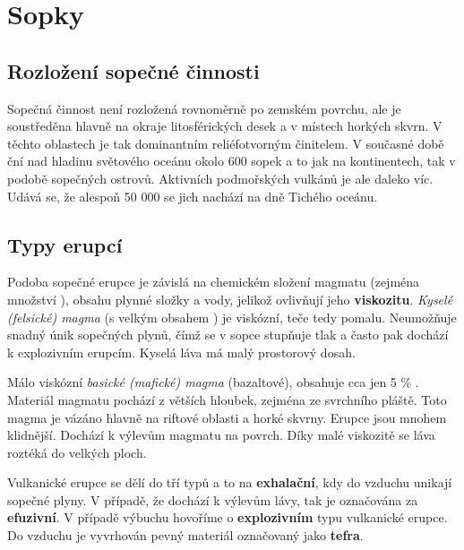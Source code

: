 \section{Sopky}
\subsection{Rozložení sopečné činnosti}

Sopečná činnost není rozložená rovnoměrně po zemském povrchu, ale je soustředěna hlavně na okraje litosférických desek a v místech horkých skvrn. V těchto oblastech je tak dominantním reliéfotvorným činitelem. V současné době ční nad hladinu světového oceánu okolo 600 sopek a to jak na kontinentech, tak v podobě sopečných ostrovů. Aktivních podmořských vulkánů je ale daleko víc. Udává se, že alespoň 50 000 se jich nachází na dně Tichého oceánu.

\subsection{Typy erupcí}
Podoba sopečné erupce je závislá na chemickém složení magmatu (zejména množství ), obsahu plynné složky a vody, jelikož ovlivňují jeho \textbf{viskozitu}. \emph{Kyselé (felsické) magma} (s velkým obsahem ) je viskózní, teče tedy pomalu. Neumožňuje snadný únik sopečných plynů, čímž se v sopce stupňuje tlak a často pak dochází k explozivním erupcím. Kyselá láva má malý prostorový dosah.

Málo viskózní \emph{basické (mafické) magma} (bazaltové), obsahuje cca jen 5 \% . Materiál magmatu pochází z větších hloubek, zejména ze svrchního pláště. Toto magma je vázáno hlavně na riftové oblasti a horké skvrny. Erupce jsou mnohem klidnější. Dochází k výlevům magmatu na povrch. Díky malé viskozitě se láva roztéká do velkých ploch.

Vulkanické erupce se dělí do tří typů a to na \textbf{exhalační}, kdy do vzduchu unikají sopečné plyny. V případě, že dochází k výlevům lávy, tak je označována za \textbf{efuzivní}. V případě výbuchu hovoříme o \textbf{explozivním} typu vulkanické erupce. Do vzduchu je vyvrhován pevný materiál označovaný jako \textbf{tefra}.

